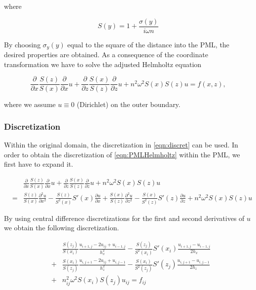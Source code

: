 \documentclass[10pt,a4paper]{article}
\begin{document}
where 

\begin{equation}
S(y)=1+\frac{\sigma(y)}{i\omega n}
\end{equation}

By choosing $\sigma_y(y)$ equal to the square of the distance into the PML, the desired properties are obtained. As a consequence of the coordinate transformation we have to solve the adjusted Helmholtz equation

\begin{equation} \label{eqn:PMLHelmholtz}
\frac{\partial }{\partial x}\frac{S(z)}{S(x)}\frac{\partial }{\partial x}u + \frac{\partial }{\partial z}\frac{S(x)}{S(z)}\frac{\partial }{\partial z}u + n^2\omega^2 S(x)S(z)u=f(x,z),
\end{equation}

where we assume $u\equiv 0$ (Dirichlet) on the outer boundary.

\subsubsection{Discretization}
Within the original domain, the discretization in \cref{eqn:discret} can be used. In order to obtain the discretization of \cref{eqn:PMLHelmholtz} within the PML, we first have to expand it. 

\begin{eqnarray}
&& \frac{\partial }{\partial x}\frac{S(z)}{S(x)}\frac{\partial }{\partial x}u + \frac{\partial }{\partial z}\frac{S(x)}{S(z)}\frac{\partial }{\partial z}u + n^2\omega^2 S(x)S(z)u\\
&=& \frac{S(z)}{S(x)}\frac{\partial^2 u}{\partial x^2}-\frac{S(z)}{S^2(x)}S'(x)\frac{\partial u}{\partial x} + \frac{S(x)}{S(z)}\frac{\partial^2 u}{\partial z^2}-\frac{S(x)}{S^2(z)}S'(z)\frac{\partial u}{\partial z}+ n^2\omega^2 S(x)S(z)u
\end{eqnarray}

By using central difference discretizations for the first and second derivatives of $u$ we obtain the following discretization.

\begin{eqnarray}
&&\frac{S(z_j)}{S(x_i)}\frac{u_{i+1,j}-2u_{ij}+u_{i-1,j}}{h_x^2}-\frac{S(z_j)}{S^2(x_i)}S'(x_i)\frac{u_{i+1,j}-u_{i-1,j}}{2h_x}\\
&+& \frac{S(x_i)}{S(z_j)}\frac{u_{i,j+1}-2u_{ij}+u_{i,j-1}}{h_z^2}-\frac{S(x_i)}{S^2(z_j)}S'(z_j)\frac{u_{i,j+1}-u_{i,j-1}}{2h_z}\\
&+& n_{ij}^2\omega^2 S(x_i)S(z_j)u_{ij}=f_{ij}
\end{eqnarray}
\end{document}
